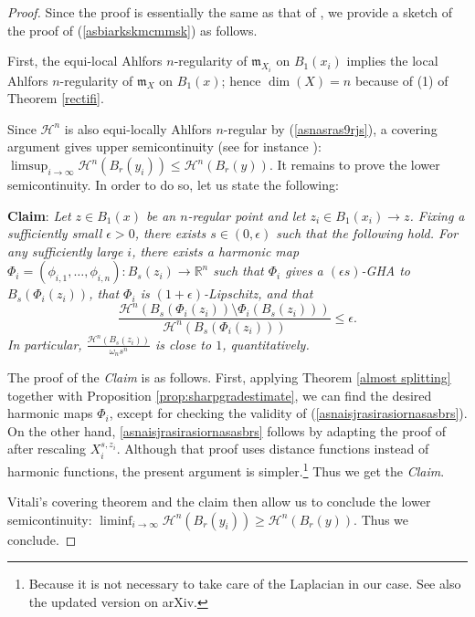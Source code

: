 \documentclass[11pt,reqno]{amsart}
\theoremstyle{definition}
\numberwithin{equation}{section}
\newcommand{\meas}{\mathfrak{m}}
\newcommand{\haus}{\mathscr{H}}
\begin{document}
\begin{proof}
    Since the proof is essentially the same as that of \cite{DG}, we provide a sketch of the proof of (\ref{asbiarkskmcmmsk}) as follows.


    First, the equi-local Ahlfors $n$-regularity of $\meas_{X_i}$ on $B_1(x_i)$ implies the local Ahlfors $n$-regularity of $\meas_X$ on $B_1(x)$; hence $\dim(X)=n$ because of (1) of Theorem \ref{rectifi}.
    
Since $\haus^n$ is also equi-locally Ahlfors $n$-regular by (\ref{asnasras9rjs}), a covering argument gives upper semicontinuity (see for instance \cite[Proposition 2.3]{Honda0}):
    $
        \limsup_{i\to \infty}\haus^n(B_r(y_i)) \le \haus^n(B_r(y)).
$
    It remains to prove the lower semicontinuity. In order to do so, let us state the following:
    \smallskip
    
    \textbf{Claim}: \textit{Let $z \in B_1(x)$ be an $n$-regular point and let $z_i \in B_1(x_i) \to z$. Fixing a sufficiently small $\epsilon>0$, there exists $s \in (0, \epsilon)$ such that the following hold. For any sufficiently large $i$, there exists a harmonic map $\Phi_i=(\phi_{i, 1}, \ldots, \phi_{i, n}):B_s(z_i) \to \mathbb{R}^n$ such that $\Phi_i$ gives a $(\epsilon s)$-GHA to $B_s(\Phi_i(z_i))$, that $\Phi_i$ is $(1+\epsilon)$-Lipschitz, and that 
    \begin{equation}\label{asnaisjrasirasiornasasbrs}
        \frac{\haus^n(B_s(\Phi_i(z_i)) \setminus \Phi_i(B_s(z_i)))}{\haus^n(B_s(\Phi_i(z_i)))} \le \epsilon.
    \end{equation}
    In particular, $\frac{\haus^n(B_s(z_i))}{\omega_n s^n}$ is close to $1$, quantitatively.}
    \smallskip
    
    The proof of the {\it Claim} is as follows. First, applying Theorem \ref{almost splitting} together with Proposition \ref{prop:sharpgradestimate}, we can find the desired harmonic maps $\Phi_i$, except for checking the validity of (\ref{asnaisjrasirasiornasasbrs}). On the other hand, \eqref{asnaisjrasirasiornasasbrs} follows by adapting the proof of \cite[Proposition 3.2]{DG} after rescaling $X_i^{s, z_i}$. Although that proof uses distance functions instead of harmonic functions, the present argument is simpler.\footnote{Because it is not necessary to take care of the Laplacian in our case. See also the updated version on arXiv.}  Thus we get the {\it Claim}.

     Vitali's covering theorem and the claim then allow us to conclude the lower semicontinuity:
    $
        \liminf_{i\to \infty}\haus^n(B_r(y_i)) \ge \haus^n(B_r(y)).
 $
    Thus we conclude.
\end{proof}
\end{document}
